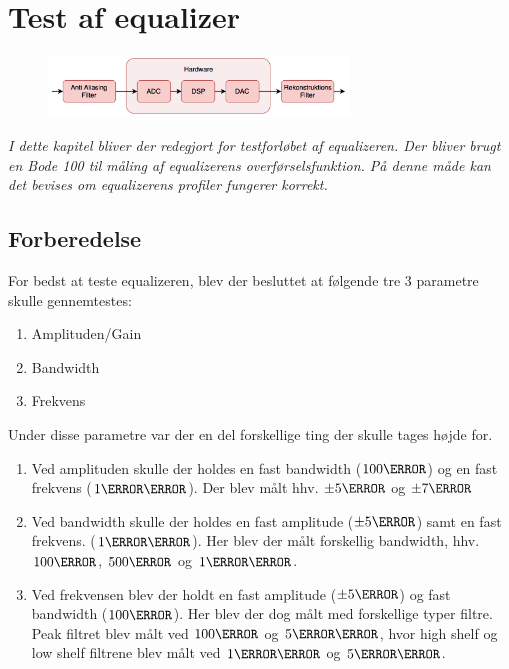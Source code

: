 
\chapter{Test af equalizer}\label{sec:test_eq}


\begin{figure}[h]
	\vspace*{-1 cm}
	\includegraphics[width=8cm]{billeder/flow_all}
	\vspace{0.5 cm}
\end{figure}


\emph{I dette kapitel bliver der redegjort for testforløbet af equalizeren. Der bliver brugt en Bode 100 til måling af equalizerens overførselsfunktion. På denne måde kan det bevises om equalizerens profiler fungerer korrekt.}

\section{Forberedelse}


For bedst at teste equalizeren, blev der besluttet at følgende tre 3 parametre skulle gennemtestes: 

\begin{enumerate}
    \item Amplituden/Gain
    \item Bandwidth
    \item Frekvens \\
\end{enumerate}



Under disse parametre var der en del forskellige ting der skulle tages højde for. 
\begin{enumerate}
    \item Ved amplituden skulle der holdes en fast bandwidth ($100\hertz$) og en fast frekvens ($1\kilo\hertz$). Der blev målt hhv. $\pm5\decibel$ og $\pm7\decibel$
    \item Ved bandwidth skulle der holdes en fast amplitude ($\pm5\decibel$) samt en fast frekvens. ($1\kilo\hertz$). Her blev der målt forskellig bandwidth, hhv. $100\hertz$, $500\hertz$ og $1\kilo\hertz$.
    \item Ved frekvensen blev der holdt en fast amplitude ($\pm5\decibel$) og fast bandwidth ($100\hertz$). Her blev der dog målt med forskellige typer filtre. Peak filtret blev målt ved $100\hertz$ og $5\kilo\hertz$, hvor high shelf og low shelf filtrene blev målt ved $1\kilo\hertz$ og $5\kilo\hertz$. \\
\end{enumerate}

